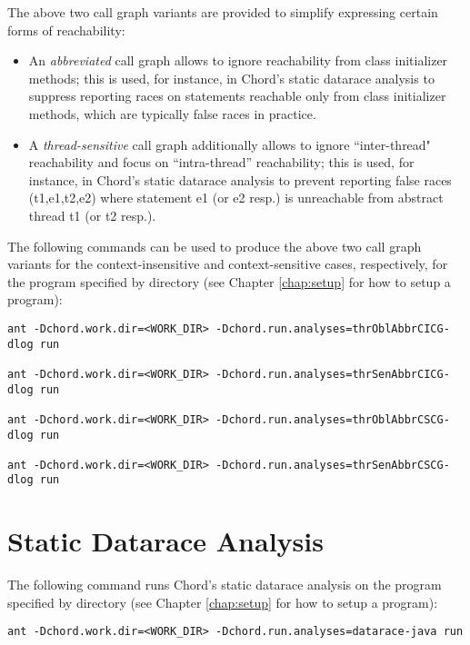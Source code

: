 The above two call graph variants are provided to simplify expressing
certain forms of reachability:
\begin{itemize}
\item
An {\it abbreviated} call graph allows to ignore reachability from
class initializer methods;
this is used, for instance, in Chord's static datarace analysis to
suppress reporting races on statements reachable only from class initializer
methods, which are typically false races in practice.
\item
A {\it thread-sensitive} call graph additionally allows to ignore
``inter-thread" reachability and focus on ``intra-thread'' reachability; this is
used, for instance, in Chord's static datarace analysis to prevent reporting
false races (t1,e1,t2,e2) where statement e1 (or e2 resp.) is unreachable from
abstract thread t1 (or t2 resp.).
\end{itemize}

The following commands can be used to produce the above two call graph variants
for the context-insensitive and context-sensitive cases, respectively, for the
program specified by directory  (see Chapter \ref{chap:setup}
for how to setup a program):

\begin{framed}
\begin{verbatim}
ant -Dchord.work.dir=<WORK_DIR> -Dchord.run.analyses=thrOblAbbrCICG-dlog run

ant -Dchord.work.dir=<WORK_DIR> -Dchord.run.analyses=thrSenAbbrCICG-dlog run

ant -Dchord.work.dir=<WORK_DIR> -Dchord.run.analyses=thrOblAbbrCSCG-dlog run

ant -Dchord.work.dir=<WORK_DIR> -Dchord.run.analyses=thrSenAbbrCSCG-dlog run
\end{verbatim}
\end{framed}


\section{Static Datarace Analysis}

The following command runs Chord's static datarace analysis on the
program specified by directory  (see Chapter \ref{chap:setup}
for how to setup a program):

\begin{framed}
\begin{verbatim}
ant -Dchord.work.dir=<WORK_DIR> -Dchord.run.analyses=datarace-java run
\end{verbatim}
\end{framed}


